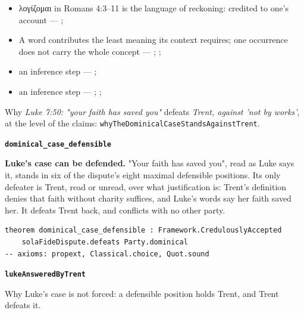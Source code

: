 \documentclass[11pt]{article}
\begin{document}
\begin{itemize}
\begin{itemize}
\item λογίζομαι in Romans 4:3–11 is the language of reckoning: credited to one's account --- \cite[s.v. λογίζομαι]{bauer-danker-lexicon-2000}; \cite[ad loc. Rom 4:3]{moo-romans-1996}
\item A word contributes the least meaning its context requires; one occurrence does not carry the whole concept --- \cite{silva-biblical-words-1994}; \cite{joos-semantic-axiom-1972}; \cite{barr-semantics-2004}
\item an inference step --- \cite[ad loc. Rom 4:6]{moo-romans-1996}; \cite[s.v. λογίζομαι]{bauer-danker-lexicon-2000}
\item an inference step --- \cite{silva-biblical-words-1994}; \cite[p. 80]{moo-romans-1996}; \cite{barr-semantics-2004}
\end{itemize}
\end{itemize}
\noindent Why \emph{Luke 7:50: "your faith has saved you"} defeats \emph{Trent, against 'not by works'}, at the level of the claims: \texttt{why\allowbreak{}The\allowbreak{}Dominical\allowbreak{}Case\allowbreak{}Stands\allowbreak{}Against\allowbreak{}Trent}.
\par\medskip\noindent\textbf{\texttt{dominical\_\allowbreak{}case\_\allowbreak{}defensible}}\par\nobreak\noindent
\textbf{Luke's case can be defended.} "Your faith has saved you", read as Luke says it, stands in six of the dispute's eight maximal defensible positions. Its only defeater is Trent, read or unread, over what justification is: Trent's definition denies that faith without charity suffices, and Luke's words say her faith saved her. It defeats Trent back, and conflicts with no other party.

{\small\begin{verbatim}
theorem dominical_case_defensible : Framework.CredulouslyAccepted
    solaFideDispute.defeats Party.dominical
-- axioms: propext, Classical.choice, Quot.sound
\end{verbatim}}
\par\medskip\noindent\textbf{\texttt{luke\allowbreak{}Answered\allowbreak{}By\allowbreak{}Trent}}\par\nobreak\noindent
Why Luke's case is not forced: a defensible position holds Trent, and Trent defeats it.
\end{document}
